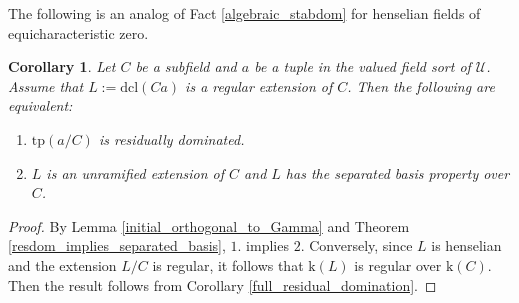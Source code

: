 \documentclass[12pt]{article}
\newcommand{\tpp}{\mathrm{tp}}
\newcommand{\dcl}{\mathrm{dcl}}
\newcommand{\val}{\textit{v}}
\newcommand{\0}{\emptyset}
\newcommand{\rf}{\mathrm{k}}
\newcommand{\U}{\mathcal{U}}
\theoremstyle{plain}%
\newtheorem{cor}[thm]{Corollary}
\theoremstyle{definition}
\theoremstyle{remark}
\begin{document}







The following is an analog of Fact \ref{algebraic_stabdom} for henselian fields of equicharacteristic zero. 

\begin{cor}\label{algebraic_resdom} Let $C$ be a subfield and $a$ be a tuple in the valued field sort of $\U$. Assume that $L:=\dcl(Ca)$ is a regular extension of $C$. Then the following are equivalent:

\begin{enumerate}
\item $\tpp(a/C)$ is residually dominated.
\item  $L$ is an unramified extension of $C$ and $L$ has the separated basis property over $C$. 
\end{enumerate}
\end{cor}
\begin{proof}
By Lemma \ref{initial_orthogonal_to_Gamma} and Theorem \ref{resdom_implies_separated_basis}, $1.$ implies $2.$ Conversely, since $L$ is henselian and the extension $L/C$ is regular, it follows that $\rf(L)$ is regular over $\rf(C)$. Then the result follows from Corollary \ref{full_residual_domination}. \end{proof}
\end{document}
